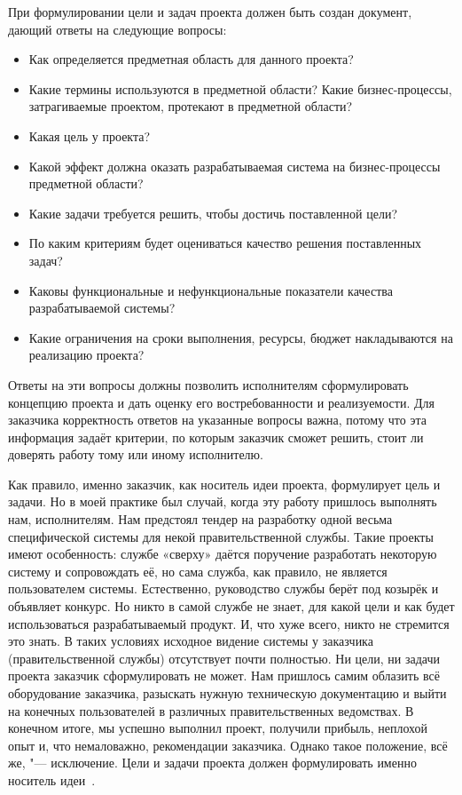 \documentclass{../industrial-development}
\begin{document}
При формулировании цели и задач проекта должен быть создан документ, дающий ответы на следующие вопросы:
\begin{itemize}
	\item Как определяется предметная область для данного проекта?
	\item Какие термины используются в предметной области? Какие бизнес-процессы, затрагиваемые проектом, протекают в предметной области?
	\item Какая цель у проекта?
	\item Какой эффект должна оказать разрабатываемая система на бизнес-процессы предметной области?
	\item Какие задачи требуется решить, чтобы достичь поставленной цели?
	\item По каким критериям будет оцениваться качество решения поставленных задач?
	\item Каковы функциональные и нефункциональные показатели качества разрабатываемой системы?
	\item Какие ограничения на сроки выполнения, ресурсы, бюджет накладываются на реализацию проекта?
\end{itemize}

Ответы на эти вопросы должны позволить исполнителям сформулировать концепцию проекта и дать оценку его востребованности и реализуемости. Для заказчика корректность ответов на указанные вопросы важна, потому что эта информация задаёт критерии, по которым заказчик сможет решить, стоит ли доверять работу тому или иному исполнителю.

Как правило, именно заказчик, как носитель идеи проекта, формулирует цель и задачи. Но в моей практике был случай, когда эту работу пришлось выполнять нам, исполнителям. Нам предстоял тендер на разработку одной весьма специфической системы для некой правительственной службы. Такие проекты имеют особенность: службе «сверху» даётся поручение разработать некоторую систему и сопровождать её, но сама служба, как правило, не является пользователем системы. Естественно, руководство службы берёт под козырёк и объявляет конкурс. Но никто в самой службе не знает, для какой цели и как будет использоваться разрабатываемый продукт. И, что хуже всего, никто не стремится это знать. В таких условиях исходное видение системы у заказчика (правительственной службы) отсутствует почти полностью. Ни цели, ни задачи проекта заказчик сформулировать не может. Нам пришлось самим облазить всё оборудование заказчика, разыскать нужную техническую документацию и выйти на конечных пользователей в различных правительственных ведомствах. В конечном итоге, мы успешно выполнил проект, получили прибыль, неплохой опыт и, что немаловажно, рекомендации заказчика. Однако такое положение, всё же, "--- исключение. Цели и задачи проекта должен формулировать именно носитель идеи~\cite{Habr1}.
\end{document}
